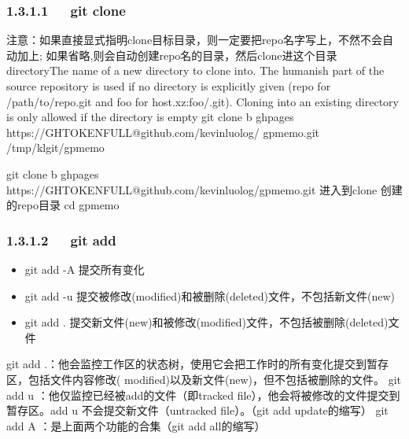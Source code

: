 \documentclass[letterpaper,12pt,english]{sphinxmanual}
\begin{document}
\subsubsection{1.3.1.1   git clone}
\label{\detokenize{001software/001install/001._u7f51_u7ad9/github:git-clone}}
\begin{sphinxVerbatim}[commandchars=\\\{\}]
\PYGZsh{} 注意：如果直接显式指明clone目标目录，则一定要把repo名字写上，不然不会自动加上;   如果省略,则会自动创建repo名的目录，然后clone进这个目录
\PYGZsh{} \PYGZlt{}directory\PYGZgt{}The name of a new directory to clone into. The \PYGZdq{}humanish\PYGZdq{}    part of the source repository is used if no directory is explicitly given    (repo for /path/to/repo.git and foo for host.xz:foo/.git). Cloning into    an existing directory is only allowed if the directory is empty  \PYGZsh{}\PYGZhy{} git    clone \PYGZhy{}b gh\PYGZhy{}pages https://\PYGZdl{}GH\PYGZus{}TOKEN\PYGZus{}FULL@github.com/kevinluolog/   gp\PYGZhy{}memo.git /tmp/klgit/gp\PYGZhy{}memo

  \PYGZhy{} git clone \PYGZhy{}b gh\PYGZhy{}pages https://\PYGZdl{}GH\PYGZus{}TOKEN\PYGZus{}FULL@github.com/kevinluolog/gp\PYGZhy{}memo.git
\PYGZsh{} 进入到clone 创建的repo目录
  \PYGZhy{} cd gp\PYGZhy{}memo
\end{sphinxVerbatim}


\subsubsection{1.3.1.2   git add}
\label{\detokenize{001software/001install/001._u7f51_u7ad9/github:git-add}}\begin{itemize}
\item {} 
git add -A  提交所有变化

\item {} 
git add -u  提交被修改(modified)和被删除(deleted)文件，不包括新文件(new)

\item {} 
git add .  提交新文件(new)和被修改(modified)文件，不包括被删除(deleted)文件

\end{itemize}

\begin{sphinxVerbatim}[commandchars=\\\{\}]
git add .：他会监控工作区的状态树，使用它会把工作时的所有变化提交到暂存区，包括文件内容修改(   modified)以及新文件(new)，但不包括被删除的文件。
git add \PYGZhy{}u ：他仅监控已经被add的文件（即tracked    file），他会将被修改的文件提交到暂存区。add \PYGZhy{}u 不会提交新文件（untracked    file）。（git add \PYGZhy{}\PYGZhy{}update的缩写）
git add \PYGZhy{}A ：是上面两个功能的合集（git add \PYGZhy{}\PYGZhy{}all的缩写）
\end{sphinxVerbatim}
\end{document}
